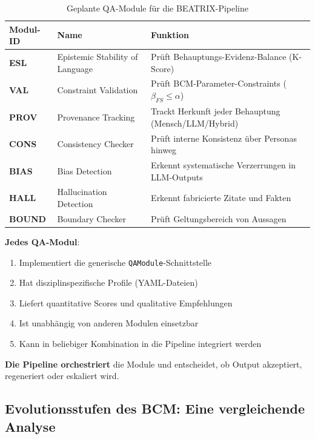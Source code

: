 \begin{table}[h]
\centering
\caption{Geplante QA-Module für die BEATRIX-Pipeline}
\small
\begin{tabular}{@{}llp{6cm}@{}}
\toprule
\textbf{Modul-ID} & \textbf{Name} & \textbf{Funktion} \\
\midrule
\textbf{ESL} & Epistemic Stability of Language & Prüft Behauptungs-Evidenz-Balance (K-Score) \\
\textbf{VAL} & Constraint Validation & Prüft BCM-Parameter-Constraints ($\beta_{FS} \leq \alpha$) \\
\textbf{PROV} & Provenance Tracking & Trackt Herkunft jeder Behauptung (Mensch/LLM/Hybrid) \\
\textbf{CONS} & Consistency Checker & Prüft interne Konsistenz über Personas hinweg \\
\textbf{BIAS} & Bias Detection & Erkennt systematische Verzerrungen in LLM-Outputs \\
\textbf{HALL} & Hallucination Detection & Erkennt fabricierte Zitate und Fakten \\
\textbf{BOUND} & Boundary Checker & Prüft Geltungsbereich von Aussagen \\
\bottomrule
\end{tabular}
\end{table}

\begin{tcolorbox}[colback=purple!5!white, colframe=purple!75!black, title=Architektur-Prinzip: QA-Module]
\textbf{Jedes QA-Modul}:
\begin{enumerate}
    \item Implementiert die generische \texttt{QAModule}-Schnittstelle
    \item Hat disziplinspezifische Profile (YAML-Dateien)
    \item Liefert quantitative Scores und qualitative Empfehlungen
    \item Ist unabhängig von anderen Modulen einsetzbar
    \item Kann in beliebiger Kombination in die Pipeline integriert werden
\end{enumerate}

\textbf{Die Pipeline orchestriert} die Module und entscheidet, ob Output akzeptiert, regeneriert oder eskaliert wird.
\end{tcolorbox}

\subsection{Evolutionsstufen des BCM: Eine vergleichende Analyse}

